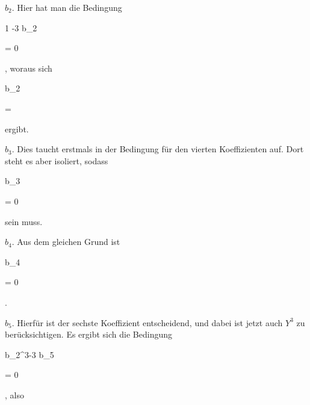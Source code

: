 {$b_2$. Hier hat man die Bedingung


\mavergleichskettedisp

{\vergleichskette

{ 1 -3 b_2
}

{ =} { 0
}

{ } {
}

{ } {
}

{ } {
}

}
{}{}{,}
woraus sich


\mavergleichskette

{\vergleichskette

{ b_2
}

{ = }{ 
}

{  }{
}

{    }{
}

{   }{
}

}
{}{}{}
ergibt.


$b_3$. Dies taucht erstmals in der Bedingung für den vierten Koeffizienten auf. Dort steht es aber isoliert, sodass


\mavergleichskette

{\vergleichskette

{b_3
}

{ = }{ 0
}

{  }{
}

{    }{
}

{   }{
}

}
{}{}{}
sein muss.


$b_4$. Aus dem gleichen Grund ist


\mavergleichskette

{\vergleichskette

{b_4
}

{ = }{ 0
}

{  }{
}

{    }{
}

{   }{
}

}
{}{}{.}


$b_5$. Hierfür ist der sechste Koeffizient entscheidend, und dabei ist jetzt auch $Y^3$ zu berücksichtigen. Es ergibt sich die Bedingung


\mavergleichskettedisp

{\vergleichskette

{ b_2^3-3 b_5
}

{ =} { 0
}

{ } {
}

{ } {
}

{ } {
}

}
{}{}{,}
also


}

